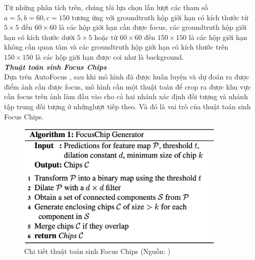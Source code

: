{    \noindent
    Từ những phân tích trên, chúng tôi lựa chọn lần lượt các tham số $a = 5, b = 60, c = 150$ tương ứng với groundtruth hộp giới hạn có kích thước từ $5 \times 5$ đến $60 \times 60$ là các hộp giới hạn cần được focus, các groundtruth hộp giới hạn có kích thước dưới $5 \times 5$ hoặc từ $60 \times 60$ đến $150 \times 150$ là các hộp giới hạn không cần quan tâm và các groundtruth hộp giới hạn có kích thước trên $150 \times 150$ là các hộp giới hạn được coi như là background. \\

    \noindent
    \textbf{\textit{Thuật toán sinh Focus Chips}} \\
    Dựa trên AutoFocus \cite{najibi2019autofocus}, sau khi mô hình đã được huấn luyện và dự đoán ra được điểm ảnh cần được focus, mô hình cần một thuật toán để crop ra được khu vực cần focus trên ảnh làm đầu vào cho cả hai nhánh xác định đối tượng và nhánh tập trung đối tượng ở nhữnglượt tiếp theo.
    Và đó là vai trò của thuật toán sinh Focus Chips.

    \begin{figure}[H]
        \centering
        \includegraphics[width=10cm] {images/autofocus_focus_chip_gen}
        \caption{Chi tiết thuật toán sinh Focus Chips (Nguồn: \cite{najibi2019autofocus})}
        \label{fig:autofocus_focus_chip_gen}
    \end{figure}

}

